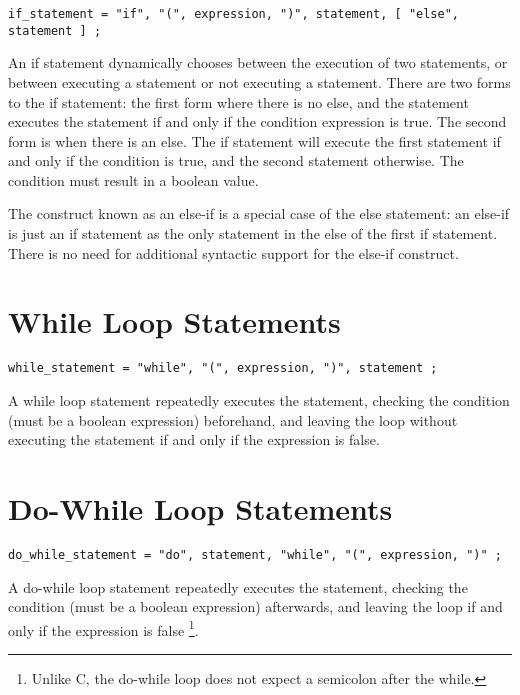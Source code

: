 \documentclass[letterpaper,12pt]{book}
\begin{document}
\begin{lstlisting}[breaklines=true]
if_statement = "if", "(", expression, ")", statement, [ "else", statement ] ;
\end{lstlisting}

An if statement dynamically chooses between the execution of two statements, or between executing a statement or not executing a statement. There are two forms to the if statement: the first form where there is no else, and the statement executes the statement if and only if the condition expression is true. The second form is when there is an else. The if statement will execute the first statement if and only if the condition is true, and the second statement otherwise. The condition must result in a boolean value.

The construct known as an else-if is a special case of the else statement: an else-if is just an if statement as the only statement in the else of the first if statement. There is no need for additional syntactic support for the else-if construct.

\section{While Loop Statements}

\begin{lstlisting}[breaklines=true]
while_statement = "while", "(", expression, ")", statement ;
\end{lstlisting}

A while loop statement repeatedly executes the statement, checking the condition (must be a boolean expression) beforehand, and leaving the loop without executing the statement if and only if the expression is false.

\section{Do-While Loop Statements}

\begin{lstlisting}[breaklines=true]
do_while_statement = "do", statement, "while", "(", expression, ")" ;
\end{lstlisting}

A do-while loop statement repeatedly executes the statement, checking the condition (must be a boolean expression) afterwards, and leaving the loop if and only if the expression is false
\footnote{Unlike C, the do-while loop does not expect a semicolon after the while.}.
\end{document}
